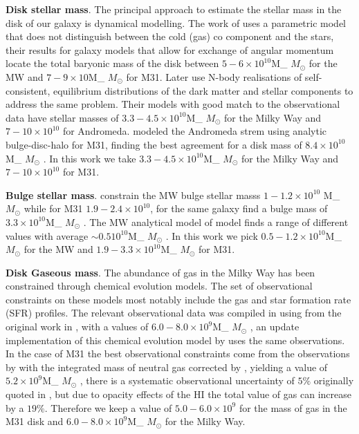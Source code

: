 \documentclass[useAMS,usenatbib]{mn2e}
\def \Msun {\ifmmode M_{\odot} \else $M_{\odot}$ \fi}
\begin{document}
{\bf Disk stellar mass}. The principal approach to estimate the
stellar mass in the disk of our galaxy is dynamical modelling. The
work of \cite{Klypin2002} uses a parametric model that does not
distinguish between the cold (gas) co component and the stars, their
results for galaxy models that allow for exchange of angular momentum
locate the total baryonic mass of the disk between $5-6\times
10^{10}$\Msun for the MW and $7-9\times 10$\Msun for M31. Later
\cite{Widrow2005} use N-body realisations of self-consistent,
equilibrium distributions of the dark matter and stellar components to
address the same problem. Their models with good match to the
observational data have stellar masses of $3.3-4.5\times 10^{10}$\Msun
for the Milky Way and $7-10\times 10^{10}$ for
Andromeda. \citep{Geehan2006} modeled the Andromeda strem using
analytic bulge-disc-halo for M31, finding the best agreement for a
disk mass of $8.4\times 10^{10}$\Msun. In this work we take
$3.3-4.5\times 10^{10}$\Msun for the Milky Way and $7-10\times
10^{10}$ for M31.

{\bf Bulge stellar mass}. \cite{Klypin2002} constrain the MW bulge
stellar masss $1-1.2\times 10^{10}$ \Msun while for M31 $1.9-2.4\times
10^{10}$, for the same galaxy \citep{Geehan2006} find a bulge mass of
$3.3\times 10^{10}$\Msun. The MW analytical model of model
\citep{Dehnen1998} finds a range of different values with average
$\sim 0.5 10^{10}$\Msun. In this work we pick $0.5-1.2 \times
10^{10}$\Msun for the MW and $1.9-3.3\times 10^{10}$\Msun for M31.

{\bf Disk Gaseous mass}. The abundance of gas in the Milky Way has
been constrained through chemical evolution models. The set of
observational constraints on these models most notably include the gas
and star formation rate (SFR) profiles. The relevant observational
data was compiled in \citep{Boissier99} using from the original work
in \cite{Kulkarni87,Dame93}, with a values of $6.0-8.0 \times
10^{9}$\Msun, an update implementation of this chemical evolution
model by \citep{Yin09} uses the same observations. In the case of M31
the best observational constraints come from the observations by
\citep{Cram80} with the integrated mass of neutral gas corrected by
\citep{Dame93}, yielding a value of $5.2\times 10^{9}$\Msun, there is
a systematic observational uncertainty of $5\%$ originally quoted in
\citep{Cram80}, but due to opacity effects of the HI \citep{Braun92}
the total value of gas can increase by a $19\%$. Therefore we keep a
value of $5.0-6.0\times 10^{9}$ for the mass of gas in the M31 disk
and $6.0-8.0\times 10^{9}$\Msun for the Milky Way.
\end{document}
